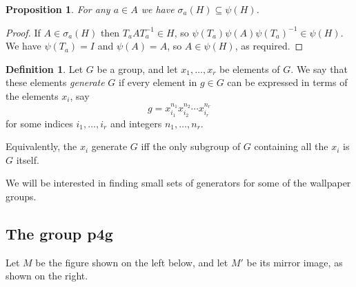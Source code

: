 \documentclass{amsart}
\DeclareMathOperator{\Trans}    {Trans}
\DeclareMathOperator{\Isom}     {Isom}
\newcommand{\sse}       {\subseteq}
\newcommand{\sg}        {\sigma}
\renewcommand{\:}{\colon}
\newtheorem{proposition}[theorem]{Proposition}
\theoremstyle{definition}
\newtheorem{definition}[theorem]{Definition}
\begin{document}
\begin{proposition}
 For any $a\in A$ we have $\sg_a(H)\sse\psi(H)$.
\end{proposition}
\begin{proof}
 If $A\in\sg_a(H)$ then $T_aAT_a^{-1}\in H$, so
 $\psi(T_a)\psi(A)\psi(T_a)^{-1}\in\psi(H)$.  We have $\psi(T_a)=I$
 and $\psi(A)=A$, so $A\in\psi(H)$, as required.
\end{proof}

\begin{definition}\label{defn-gens}
 Let $G$ be a group, and let $x_1,\ldots,x_r$ be elements of $G$.  We
 say that these elements \emph{generate} $G$ if every element in
 $g\in G$ can be expressed in terms of the elements $x_i$, say
 \[ g = x_{i_1}^{n_1}x_{i_2}^{n_2}\dotsb x_{i_r}^{n_r} \]
 for some indices $i_1,\ldots,i_r$ and integers $n_1,\ldots,n_r$.  

 Equivalently, the $x_i$ generate $G$ iff the only subgroup of $G$
 containing all the $x_i$ is $G$ itself.
\end{definition}

We will be interested in finding small sets of generators for some of
the wallpaper groups. 


\subsection{The group p4g}

Let $M$ be the figure shown on the left below, and let $M'$ be its
mirror image, as shown on the right.
\begin{center}
\end{center}
\end{document}
